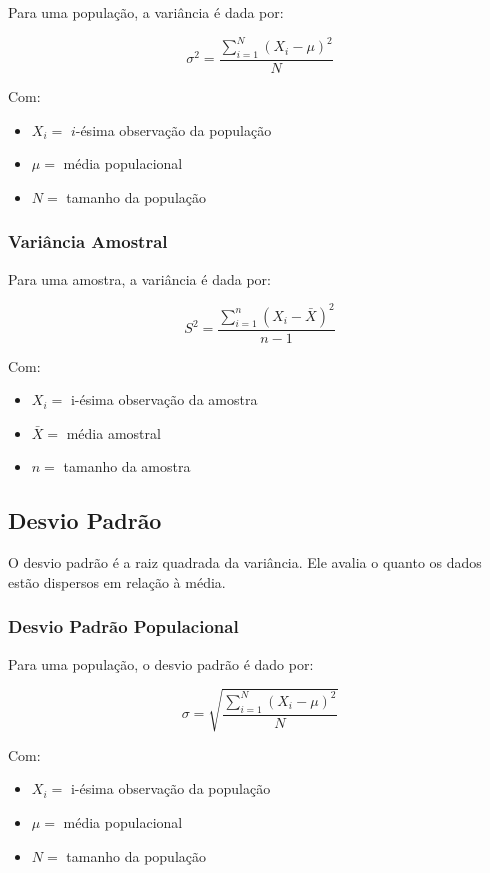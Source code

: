 \documentclass[
]{estat/estat}
\begin{document}
Para uma população, a variância é dada por:

\[\sigma^2=\frac{\sum\limits_{i=1}^{N}\left(X_i - \mu\right)^2}{N}\]

Com:

\begin{itemize}
\item
  \(X_i =\) \(i\)-ésima observação da população
\item
  \(\mu =\) média populacional
\item
  \(N =\) tamanho da população
\end{itemize}

\subsubsection{Variância Amostral}\label{variuxe2ncia-amostral}

Para uma amostra, a variância é dada por:

\[S^2=\frac{\sum\limits_{i=1}^{n}\left(X_i - \bar{X}\right)^2}{n-1}\]

Com:

\begin{itemize}
\item
  \(X_i =\) i-ésima observação da amostra
\item
  \(\bar{X} =\) média amostral
\item
  \(n =\) tamanho da amostra
\end{itemize}

\subsection{Desvio Padrão}\label{desvio-padruxe3o}

O desvio padrão é a raiz quadrada da variância. Ele avalia o quanto os
dados estão dispersos em relação à média.

\subsubsection{Desvio Padrão
Populacional}\label{desvio-padruxe3o-populacional}

Para uma população, o desvio padrão é dado por:

\[\sigma=\sqrt{\frac{\sum\limits_{i=1}^{N}\left(X_i - \mu\right)^2}{N}}\]

Com:

\begin{itemize}
\item
  \(X_i =\) i-ésima observação da população
\item
  \(\mu =\) média populacional
\item
  \(N =\) tamanho da população
\end{itemize}
\end{document}
